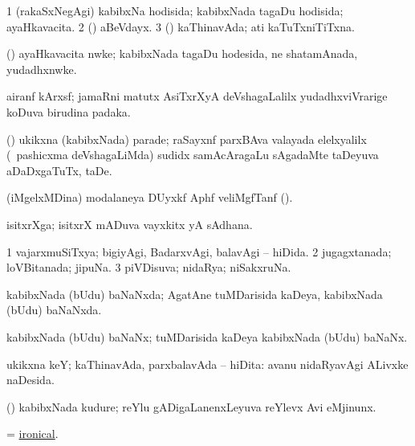 \bentry
{}
\gl{\gu}
\bmng
\bnum
\num{1} (rakaSxNegAgi) kabibxNa hodisida; kabibxNada tagaDu hodisida; ayaHkavacita. 
\num{2} (\rUpa) aBeVdayx. 
\num{3} (\rUpa) kaThinavAda; ati kaTuTxniTiTxna. 
\enum
\emng
\eentry

\bentry
{}
\gl{\nA}
\bmng
(\ca) ayaHkavacita nwke; kabibxNada tagaDu hodesida, ne shatamAnada, yudadhxnwke. 
\emng
\eentry

\bentry
{}
\gl{\nA}
\bmng
airanf kArxsf; jamaRni matutx AsiTxrXyA deVshagaLalilx yudadhxviVrarige koDuva birudina padaka. 
\emng
\eentry

\bentry
{}
\gl{\nA}
\bmng
(\rUpa) ukikxna (kabibxNada) parade; raSayxnf parxBAva valayada elelxyalilx (\kanmu\ pashicxma deVshagaLiMda) sudidx samAcAragaLu sAgadaMte taDeyuva aDaDxgaTuTx, taDe. 
\emng
\eentry

\bentry
{}
\gl{\nA}
\bmng
(iMgelxMDina) modalaneya DUyxkf Aphf veliMgfTanf (). 
\emng
\eentry

\bentry
{}
\gl{\nA}
\bmng
isitxrXga; isitxrX mADuva vayxkitx yA sAdhana. 
\emng
\eentry

\bentry
{}
\gl{\gu}
\bmng
\bnum
\num{1} vajarxmuSiTxya; bigiyAgi, BadarxvAgi, balavAgi -- hiDida. 
\num{2} jugagxtanada; loVBitanada; jipuNa. 
\num{3} piVDisuva; nidaRya; niSakxruNa. 
\enum
\emng
\eentry

\bentry
{}
\gl{\gu}
\bmng
kabibxNada (bUdu) baNaNxda; AgatAne tuMDarisida kaDeya, kabibxNada (bUdu) baNaNxda. 
\emng
\eentry

\bentry
{}
\gl{\nA}
\bmng
kabibxNada (bUdu) baNaNx; tuMDarisida kaDeya kabibxNada (bUdu) baNaNx. 
\emng
\eentry

\bentry
{}
\gl{\nA}
\bmng
ukikxna keY; kaThinavAda, parxbalavAda -- hiDita:  avanu nidaRyavAgi ALivxke naDesida. 
\emng
\eentry

\bentry
{}
\gl{\nA}
\bmng
(\pArxparx) kabibxNada kudure; reYlu gADigaLanenxLeyuva reYlevx Avi eMjinunx. 
\emng
\eentry

\bentry
{}
\gl{\gu}
\bmng
= \hyperlink{ironical}{ironical}. 
\emng
\eentry

